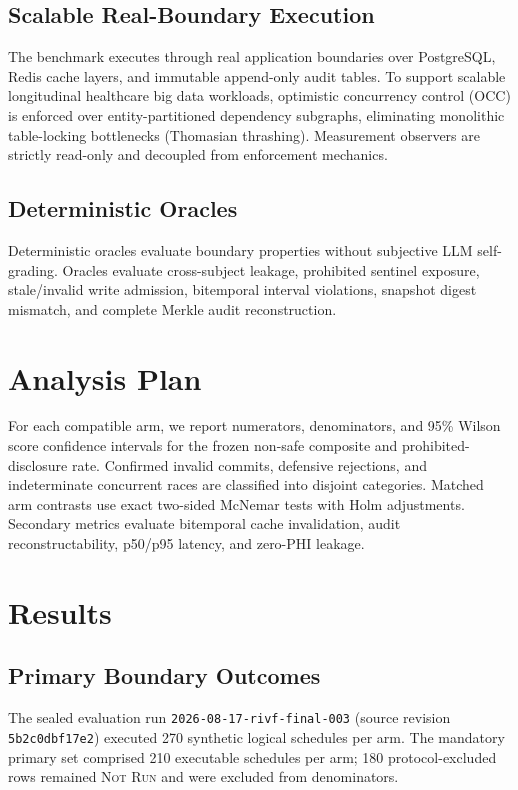 \documentclass[conference]{IEEEtran}
\begin{document}
\subsection{Scalable Real-Boundary Execution}
The benchmark executes through real application boundaries over PostgreSQL, Redis cache layers, and immutable append-only audit tables. To support scalable longitudinal healthcare big data workloads, optimistic concurrency control (OCC) is enforced over entity-partitioned dependency subgraphs, eliminating monolithic table-locking bottlenecks (Thomasian thrashing). Measurement observers are strictly read-only and decoupled from enforcement mechanics.

\subsection{Deterministic Oracles}
Deterministic oracles evaluate boundary properties without subjective LLM self-grading. Oracles evaluate cross-subject leakage, prohibited sentinel exposure, stale/invalid write admission, bitemporal interval violations, snapshot digest mismatch, and complete Merkle audit reconstruction.

\section{Analysis Plan}
For each compatible arm, we report numerators, denominators, and 95\% Wilson score confidence intervals for the frozen non-safe composite and prohibited-disclosure rate. Confirmed invalid commits, defensive rejections, and indeterminate concurrent races are classified into disjoint categories. Matched arm contrasts use exact two-sided McNemar tests with Holm adjustments. Secondary metrics evaluate bitemporal cache invalidation, audit reconstructability, p50/p95 latency, and zero-PHI leakage.

\section{Results}
\subsection{Primary Boundary Outcomes}
The sealed evaluation run \texttt{2026-08-17-rivf-final-003} (source revision \texttt{5b2c0dbf17e2}) executed 270 synthetic logical schedules per arm. The mandatory primary set comprised 210 executable schedules per arm; 180 protocol-excluded rows remained \textsc{Not Run} and were excluded from denominators.
\end{document}
